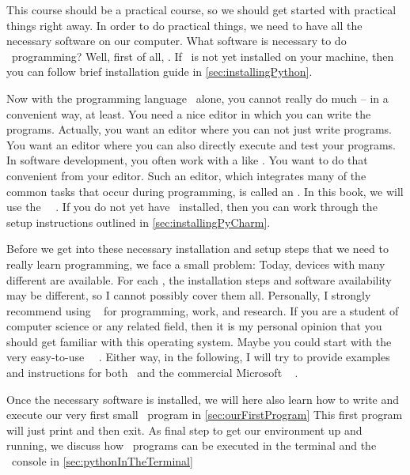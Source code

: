 %
%
This course should be a practical course, so we should get started with practical things right away.
In order to do practical things, we need to have all the necessary software on our computer.
What software is necessary to do \python\ programming?
Well, first of all, \python.
If \python\ is not yet installed on your machine, then you can follow brief installation guide in \cref{sec:installingPython}.

Now with the programming language \python\ alone, you cannot really do much -- in a convenient way, at least.
You need a nice editor in which you can write the programs.
Actually, you want an editor where you can not just write programs.
You want an editor where you can also directly execute and test your programs.
In software development, you often work with a  like \git.
You want to do that convenient from your editor.
Such an editor, which integrates many of the common tasks that occur during programming, is called an .
In this book, we will use the \pycharm\ ~\cite{VHN2023HOADWP,Y2022PPADT}.
If you do not yet have \pycharm\ installed, then you can work through the setup instructions outlined in \cref{sec:installingPyCharm}.

Before we get into these necessary installation and setup steps that we need to really learn programming, we face a small problem:
Today, devices with many different  are available.
For each , the installation steps and software availability may be different, so I cannot possibly cover them all.
Personally, I strongly recommend using \linux~\cite{T1999TLE,B2022ELATCL,H2022LML} for programming, work, and research.
If you are a student of computer science or any related field, then it is my personal opinion that you should get familiar with this operating system.
Maybe you could start with the very easy-to-use \ubuntu\ \linux~\cite{CN2020ULB,H2020ULU2E}.
Either way, in the following, I will try to provide examples and instructions for both \ubuntu\ and the commercial Microsoft \windows~\cite{B2023W1IO} .

Once the necessary software is installed, we will here also learn how to write and execute our very first small \python\ program in \cref{sec:ourFirstProgram}%
This first program will just print  and then exit.
As final step to get our environment up and running, we discuss how \python\ programs can be executed in the terminal and the \python\ console in \cref{sec:pythonInTheTerminal}%
%
%
%
%
%
%
%
%
\endhsection%
%
